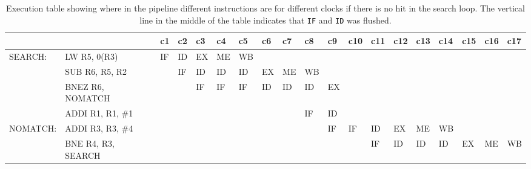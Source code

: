 \begin{landscape}
    \begin{table}[]
    \centering
    \begin{tabular}{lllllllllllllllllll}
    \hline
             &                                         & c1 & c2 & c3 & c4 & c5 & c6 & c7 & c8 & c9                      & c10 & c11 & c12 & c13 & c14 & c15 & c16 & c17 \\ \hline
    SEARCH:  & \multicolumn{1}{l|}{LW R5, 0(R3)}       & IF & ID & EX & ME & WB &    &    &    &                         &     &     &     &     &     &     &     &    \\
             & \multicolumn{1}{l|}{SUB R6, R5, R2}     &    & IF & ID & ID & ID & EX & ME & WB &                         &     &     &     &     &     &     &     &     \\
             & \multicolumn{1}{l|}{BNEZ R6, NOMATCH}   &    &    & IF & IF & IF & ID & ID & ID & \multicolumn{1}{l|}{EX} &     &     &     &     &     &     &     &     \\
             & \multicolumn{1}{l|}{ADDI R1, R1, \#1}   &    &    &    &    &    &    &    & IF & \multicolumn{1}{l|}{ID} &     &     &     &     &     &     &     &     \\
    NOMATCH: & \multicolumn{1}{l|}{ADDI R3, R3, \#4}   &    &    &    &    &    &    &    &    & \multicolumn{1}{l|}{IF} & IF  & ID  & EX  & ME  & WB  &     &     &     \\
             & \multicolumn{1}{l|}{BNE R4, R3, SEARCH} &    &    &    &    &    &    &    &    &                         &     & IF  & ID  & ID  & ID  & EX  & ME  & WB  \\ \hline
    \end{tabular}
    \caption{Execution table showing where in the pipeline different instructions are for different clocks if there is no hit in the search loop. The vertical line in the middle of the table indicates that \texttt{IF} and \texttt{ID} was flushed.}
    \label{tab:t21bmiss}
    \end{table}
\end{landscape}

